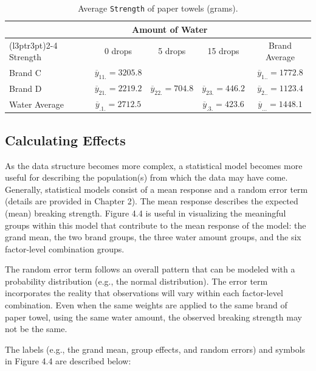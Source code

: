 \documentclass[
]{book}
\begin{document}
\begin{table}[!h]
\centering
\caption{\label{tab:tab45} Average \texttt{Strength} of paper towels (grams).}
\centering
\begin{tabular}[t]{lcccc}
\toprule
\multicolumn{1}{c}{ } & \multicolumn{3}{c}{Amount of Water} & \multicolumn{1}{c}{ } \\
\cmidrule(l{3pt}r{3pt}){2-4}
Strength & 0 drops & 5 drops & 15 drops & Brand Average\\
\midrule
Brand C & $\overline{y}_{11.} = 3205.8$ &  &  & $\overline{y}_{1..} = 1772.8$\\
Brand D & $\overline{y}_{21.} = 2219.2$ & $\overline{y}_{22.} = 704.8$ & $\overline{y}_{23.} = 446.2$ & $\overline{y}_{2..} = 1123.4$\\
Water Average & $\overline{y}_{.1.} = 2712.5$ &  & $\overline{y}_{.3.} = 423.6$ & $\overline{y}_{...} = 1448.1$\\
\bottomrule
\end{tabular}
\end{table}

\hypertarget{calculating-effects}{%
\subsection*{Calculating Effects}\label{calculating-effects}}

As the data structure becomes more complex, a statistical model becomes more useful for describing the population(s) from which the data may have come. Generally, statistical models consist of a mean response and a random error term (details are provided in Chapter 2). The mean response describes the expected (mean) breaking strength. Figure 4.4 is useful in visualizing the meaningful groups within this model that contribute to the mean response of the model: the grand mean, the two brand groups, the three water amount groups, and the six factor-level combination groups.

The random error term follows an overall pattern that can be modeled with a probability distribution (e.g., the normal distribution). The error term incorporates the reality that observations will vary within each factor-level combination. Even when the same weights are applied to the same brand of paper towel, using the same water amount, the observed breaking strength may not be the same.

The labels (e.g., the grand mean, group effects, and random errors) and symbols in Figure 4.4 are described below:
\end{document}
